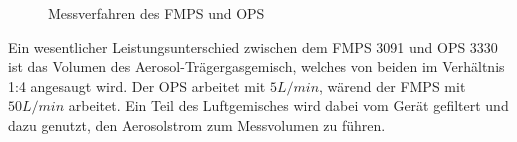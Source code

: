 \begin{figure}[H]
	\myfloatalign
	 \quad
	\caption[Messverfahren des FMPS und OPS]
	{Messverfahren des FMPS und OPS}
	\label{fig:laser_schwert}
\end{figure}

Ein wesentlicher Leistungsunterschied zwischen dem FMPS 3091 und OPS 3330 ist das Volumen des Aerosol-Tr\"{a}gergasgemisch, welches von beiden im Verh\"{a}ltnis 1:4 angesaugt wird. Der OPS arbeitet mit $5 L/min$, w\"{a}rend der FMPS mit $50 L/min$ arbeitet. Ein Teil des Luftgemisches wird dabei vom Ger\"{a}t gefiltert und dazu genutzt, den Aerosolstrom zum Messvolumen zu f\"{u}hren.